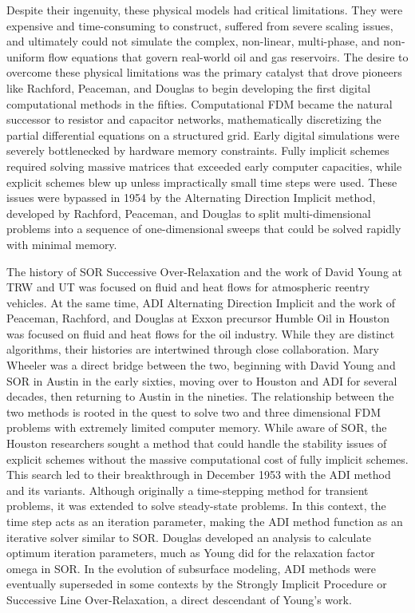 Despite their ingenuity, these physical models had critical limitations. They were expensive and time-consuming to construct, suffered from severe scaling issues, and ultimately could not simulate the complex, non-linear, multi-phase, and non-uniform flow equations that govern real-world oil and gas reservoirs. The desire to overcome these physical limitations was the primary catalyst that drove pioneers like Rachford, Peaceman, and Douglas to begin developing the first digital computational methods in the fifties. Computational FDM became the natural successor to resistor and capacitor networks, mathematically discretizing the partial differential equations on a structured grid. Early digital simulations were severely bottlenecked by hardware memory constraints. Fully implicit schemes required solving massive matrices that exceeded early computer capacities, while explicit schemes blew up unless impractically small time steps were used. These issues were bypassed in 1954 by the Alternating Direction Implicit method, developed by Rachford, Peaceman, and Douglas to split multi-dimensional problems into a sequence of one-dimensional sweeps that could be solved rapidly with minimal memory.

The history of SOR Successive Over-Relaxation and the work of David Young at TRW and UT was focused on fluid and heat flows for atmospheric reentry vehicles. At the same time, ADI Alternating Direction Implicit and the work of Peaceman, Rachford, and Douglas at Exxon precursor Humble Oil in Houston was focused on fluid and heat flows for the oil industry. While they are distinct algorithms, their histories are intertwined through close collaboration. Mary Wheeler was a direct bridge between the two, beginning with David Young and SOR in Austin in the early sixties, moving over to Houston and ADI for several decades, then returning to Austin in the nineties. The relationship between the two methods is rooted in the quest to solve two and three dimensional FDM problems with extremely limited computer memory. While aware of SOR, the Houston researchers sought a method that could handle the stability issues of explicit schemes without the massive computational cost of fully implicit schemes. This search led to their breakthrough in December 1953 with the ADI method and its variants. Although originally a time-stepping method for transient problems, it was extended to solve steady-state problems. In this context, the time step acts as an iteration parameter, making the ADI method function as an iterative solver similar to SOR. Douglas developed an analysis to calculate optimum iteration parameters, much as Young did for the relaxation factor omega in SOR. In the evolution of subsurface modeling, ADI methods were eventually superseded in some contexts by the Strongly Implicit Procedure or Successive Line Over-Relaxation, a direct descendant of Young's work.

